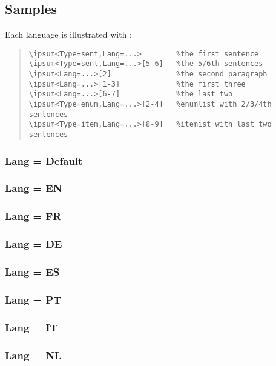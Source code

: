 \documentclass[11pt,a4paper]{ltxdoc}
\begin{document}
\subsection{Samples}

Each language is illustrated with :

\begin{quote}
\begin{verbatim}
\ipsum<Type=sent,Lang=...>        %the first sentence
\ipsum<Type=sent,Lang=...>[5-6]   %the 5/6th sentences
\ipsum<Lang=...>[2]               %the second paragraph
\ipsum<Lang=...>[1-3]             %the first three
\ipsum<Lang=...>[6-7]             %the last two
\ipsum<Type=enum,Lang=...>[2-4]   %enumlist with 2/3/4th sentences
\ipsum<Type=item,Lang=...>[8-9]   %itemist with last two sentences
\end{verbatim}
\end{quote}

\pagebreak

\subsubsection{Lang = Default}


\pagebreak

\subsubsection{Lang = EN}


\pagebreak

\subsubsection{Lang = FR}


\pagebreak

\subsubsection{Lang = DE}


\pagebreak

\subsubsection{Lang = ES}


\pagebreak

\subsubsection{Lang = PT}


\pagebreak

\subsubsection{Lang = IT}


\pagebreak

\subsubsection{Lang = NL}

\end{document}
